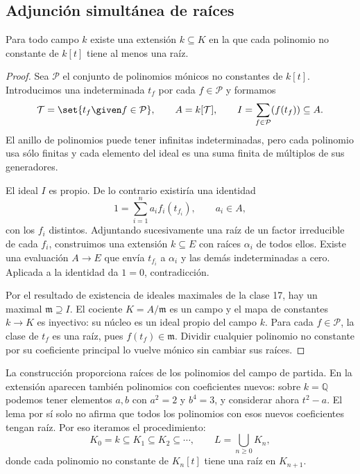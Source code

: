 \subsection{Adjunción simultánea de raíces}
\begin{lema}\label{lema:C24-raiz-simultanea}
Para todo campo $k$ existe una extensión $k\subseteq K$ en la que cada polinomio no constante de $k[t]$ tiene al menos una raíz.
\end{lema}
\begin{proof}
Sea $\mathcal P$ el conjunto de polinomios mónicos no constantes de $k[t]$. Introducimos una indeterminada $t_f$ por cada $f\in\mathcal P$ y formamos
\[
\mathcal T=\set{t_f\given f\in\mathcal P},\qquad A=k[\mathcal T],\qquad
I=\sum_{f\in\mathcal P}(f(t_f))\subseteq A.
\]
El anillo de polinomios puede tener infinitas indeterminadas, pero cada polinomio usa sólo finitas y cada elemento del ideal es una suma finita de múltiplos de sus generadores.

El ideal $I$ es propio. De lo contrario existiría una identidad
\[
1=\sum_{i=1}^n a_i f_i(t_{f_i}),\qquad a_i\in A,
\]
con los $f_i$ distintos. Adjuntando sucesivamente una raíz de un factor irreducible de cada $f_i$, construimos una extensión $k\subseteq E$ con raíces $\alpha_i$ de todos ellos. Existe una evaluación $A\to E$ que envía $t_{f_i}$ a $\alpha_i$ y las demás indeterminadas a cero. Aplicada a la identidad da $1=0$, contradicción.

Por el resultado de existencia de ideales maximales de la clase 17, hay un maximal $\mathfrak m\supseteq I$. El cociente $K=A/\mathfrak m$ es un campo y el mapa de constantes $k\to K$ es inyectivo: su núcleo es un ideal propio del campo $k$. Para cada $f\in\mathcal P$, la clase de $t_f$ es una raíz, pues $f(t_f)\in\mathfrak m$. Dividir cualquier polinomio no constante por su coeficiente principal lo vuelve mónico sin cambiar sus raíces.
\end{proof}

La construcción proporciona raíces de los polinomios del campo de partida. En la extensión aparecen también polinomios con coeficientes nuevos: sobre $k=\mathbb Q$ podemos tener elementos $a,b$ con $a^2=2$ y $b^4=3$, y considerar ahora $t^2-a$. El lema por sí solo no afirma que todos los polinomios con esos nuevos coeficientes tengan raíz. Por eso iteramos el procedimiento:
\[
K_0=k\subseteq K_1\subseteq K_2\subseteq\cdots,
\qquad L=\bigcup_{n\geq0}K_n,
\]
donde cada polinomio no constante de $K_n[t]$ tiene una raíz en $K_{n+1}$.

